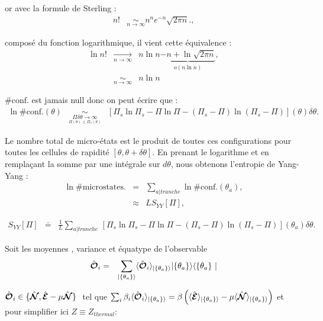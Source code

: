 	or avec la formule de Sterling :  
	\begin{eqnarray}
		n! & \underset{n \to \infty}{\sim} n^n e^{-n} \sqrt{2\pi n}.,
	\end{eqnarray}
	
	composé du fonction logarithmique, il vient cette équivalence : 
	\begin{eqnarray}
		\ln n! & \underset{n \to \infty}{\rightarrow} & n \ln n \underbrace{- n + \ln \sqrt{2 \pi n }}_{o \left ( n \ln n \right ) } ,\\
		&  \underset{n \to \infty}{\sim} & n \ln n  
	\end{eqnarray}
	
	$\# \mbox{conf.}$ est jamais null donc on peut écrire que : 
\begin{eqnarray}
    \ln \# \mbox{conf.}(\theta) & \underset{\underset{\Pi (\theta )\leq  \Pi_s (\theta )}{\Pi \delta \theta  \to \infty}}{\sim}   & [ \Pi_s\ln \Pi_s - \Pi \ln \Pi - ( \Pi_s - \Pi ) \ln ( \Pi_s - \Pi) ] (\theta )\delta \theta .
\end{eqnarray}

Le nombre total de micro-états est le produit de toutes ces configurations pour toutes les cellules de rapidité $[\theta, \theta + \delta \theta]$. En prenant le logarithme et en remplaçant la somme par une intégrale sur $d \theta$, nous obtenons l'entropie de Yang-Yang :
\begin{eqnarray}
    \ln \# \mbox{microstates.} & = & \sum_{a\vert tranche} \ln \# \mbox{conf.}(\theta_a), \\
    & \approx &  L S_{YY} [ \Pi ] , 	
\end{eqnarray}

\begin{eqnarray}
    S_{YY}[\Pi] & \doteq & \frac{1}{L} \sum_{a\vert tranche} \, [ \Pi_s\ln \Pi_s - \Pi \ln \Pi - ( \Pi_s - \Pi ) \ln ( \Pi_s - \Pi ) ] (\theta_a) \delta \theta .
\end{eqnarray}

Soit les moyennes , variance et équatype de l'observable 
	\begin{eqnarray}
		\operator{\mathcal{O}}_i & = & \sum_{\vert \{\theta_a \} \rangle} \langle \operator{\mathcal{O}}_i \rangle_{\vert \{\theta_a \} \rangle}  \vert \{ \theta_a\}\rangle	\langle \{ \theta_a \} \vert
	\end{eqnarray}
	
	$\operator{\mathcal{O}}_i \in \{\operator{\mathcal{N}} , \operator{\mathcal{E}} - \mu \operator{\mathcal{N}} \} $  tel que $\sum_i \beta_i \langle \hat{\bm{\mathcal{O}}}_i \rangle_{\vert \{\theta_a \} \rangle} = \beta \left ( \langle \hat{\bm{\mathcal{E}}} \rangle_{\vert \{\theta_a \} \rangle}   - \mu \langle \hat{\bm{\mathcal{N}}} \rangle_{\vert \{\theta_a \} \rangle} \right ) $ et pour simplifier ici $Z \equiv Z_{thermal}$:
	
